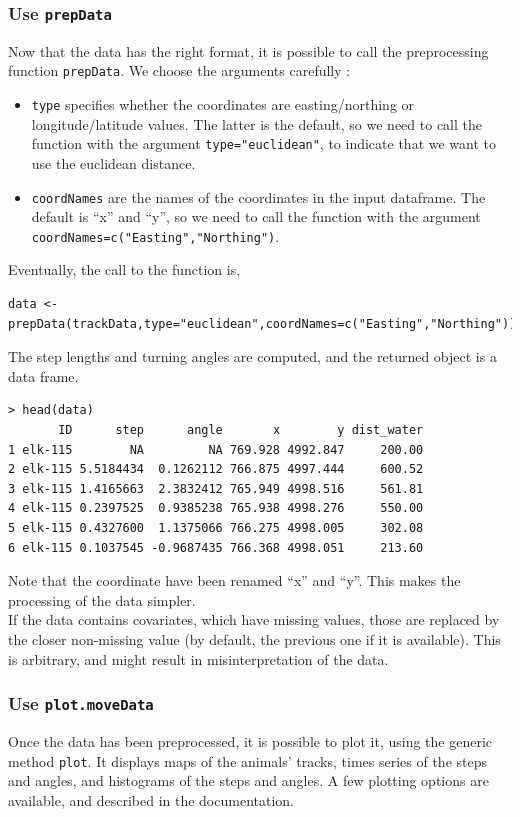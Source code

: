 \documentclass[]{article}
\begin{document}
\subsubsection{Use \texttt{prepData}}
Now that the data has the right format, it is possible to call the preprocessing function \texttt{prepData}. We choose the arguments carefully :
\begin{itemize}
	\item \texttt{type} specifies whether the coordinates are easting/northing or longitude/latitude values. The latter is the default, so we need to call the function with the argument \texttt{type="euclidean"}, to indicate that we want to use the euclidean distance.
	\item \texttt{coordNames} are the names of the coordinates in the input dataframe. The default is ``x'' and ``y'', so we need to call the function with the argument \texttt{coordNames=c("Easting","Northing")}.
\end{itemize}

\noindent Eventually, the call to the function is,

\begin{lstlisting}
data <- prepData(trackData,type="euclidean",coordNames=c("Easting","Northing"))
\end{lstlisting}

The step lengths and turning angles are computed, and the returned object is a data frame.

\begin{lstlisting}
> head(data)
       ID      step      angle       x        y dist_water
1 elk-115        NA         NA 769.928 4992.847     200.00
2 elk-115 5.5184434  0.1262112 766.875 4997.444     600.52
3 elk-115 1.4165663  2.3832412 765.949 4998.516     561.81
4 elk-115 0.2397525  0.9385238 765.938 4998.276     550.00
5 elk-115 0.4327600  1.1375066 766.275 4998.005     302.08
6 elk-115 0.1037545 -0.9687435 766.368 4998.051     213.60
\end{lstlisting}

Note that the coordinate have been renamed ``x'' and ``y''. This makes the processing of the data simpler.\\

If the data contains covariates, which have missing values, those are replaced by the closer non-missing value (by default, the previous one if it is available). This is arbitrary, and might result in misinterpretation of the data.

\subsubsection{Use \texttt{plot.moveData}}
Once the data has been preprocessed, it is possible to plot it, using the generic method \texttt{plot}. It displays maps of the animals' tracks, times series of the steps and angles, and histograms of the steps and angles. A few plotting options are available, and described in the documentation.\\
\end{document}

